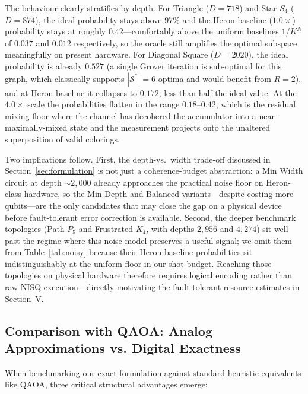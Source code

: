 \documentclass{ieeeaccess}
\begin{document}
The behaviour clearly stratifies by depth. For Triangle ($D{=}718$) and Star $S_4$ ($D{=}874$), the ideal probability stays above $97\%$ and the Heron-baseline ($1.0\times$) probability stays at roughly $0.42$---comfortably above the uniform baselines $1/K^N$ of $0.037$ and $0.012$ respectively, so the oracle still amplifies the optimal subspace meaningfully on present hardware. For Diagonal Square ($D{=}2020$), the ideal probability is already $0.527$ (a single Grover iteration is sub-optimal for this graph, which classically supports $|\mathcal{S}^*|{=}6$ optima and would benefit from $R{=}2$), and at Heron baseline it collapses to $0.172$, less than half the ideal value. At the $4.0\times$ scale the probabilities flatten in the range $0.18$--$0.42$, which is the residual mixing floor where the channel has decohered the accumulator into a near-maximally-mixed state and the measurement projects onto the unaltered superposition of valid colorings.

Two implications follow. First, the depth-vs.\ width trade-off discussed in Section~\ref{sec:formulation} is not just a coherence-budget abstraction: a Min Width circuit at depth $\sim 2{,}000$ already approaches the practical noise floor on Heron-class hardware, so the Min Depth and Balanced variants---despite costing more qubits---are the only candidates that may close the gap on a physical device before fault-tolerant error correction is available. Second, the deeper benchmark topologies (Path $P_5$ and Frustrated $K_4$, with depths $2{,}956$ and $4{,}274$) sit well past the regime where this noise model preserves a useful signal; we omit them from Table~\ref{tab:noisy} because their Heron-baseline probabilities sit indistinguishably at the uniform floor in our shot-budget. Reaching those topologies on physical hardware therefore requires logical encoding rather than raw NISQ execution---directly motivating the fault-tolerant resource estimates in Section~V.

\subsection{Comparison with QAOA: Analog Approximations vs. Digital Exactness}
\label{sec:comparison}
When benchmarking our exact formulation against standard heuristic equivalents like QAOA, three critical structural advantages emerge:
\end{document}
